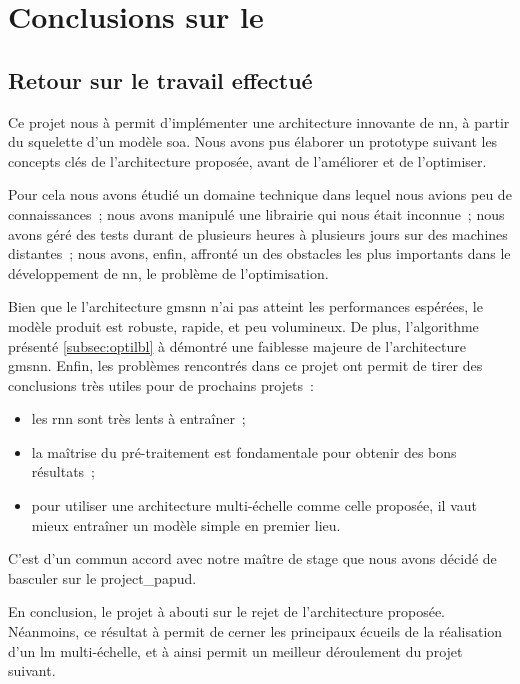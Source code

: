 \chapter{Conclusions sur le }
\section{Retour sur le travail effectué}
Ce projet nous à permit d'implémenter une architecture innovante de \gls{nn}, à partir du squelette d'un modèle \gls{soa}.
Nous avons pus élaborer un prototype suivant les concepts clés de l'architecture proposée, avant de l'améliorer et de l'optimiser.

Pour cela nous avons étudié un domaine technique dans lequel nous avions peu de connaissances~; nous avons manipulé une librairie qui nous était inconnue~;
nous avons géré des tests durant de plusieurs heures à plusieurs jours sur des machines distantes~; nous avons, enfin, affronté un des obstacles les plus importants dans le développement de \gls{nn}, le problème de l'optimisation.

Bien que le l'architecture \gls{gmsnn} n'ai pas atteint les performances espérées, le modèle produit est robuste, rapide, et peu volumineux.
De plus, l'algorithme présenté \autoref{subsec:optilbl} à démontré une faiblesse majeure de l'architecture \gls{gmsnn}.
Enfin, les problèmes rencontrés dans ce projet ont permit de tirer des conclusions très utiles pour de prochains projets~:
\begin{itemize}
	\item les \gls{rnn} sont très lents à entraîner~;
	\item la maîtrise du pré-traitement est fondamentale pour obtenir des bons résultats~;
	\item pour utiliser une architecture multi-échelle comme celle proposée, il vaut mieux entraîner un modèle simple en premier lieu.
\end{itemize}\hspace{1em}

C'est d'un commun accord avec notre maître de stage que nous avons décidé de basculer sur le \gls{project_papud}.

En conclusion, le projet à abouti sur le rejet de l'architecture proposée.
Néanmoins, ce résultat à permit de cerner les principaux écueils de la réalisation d'un \gls{lm} multi-échelle, et à ainsi permit un meilleur déroulement du projet suivant.


